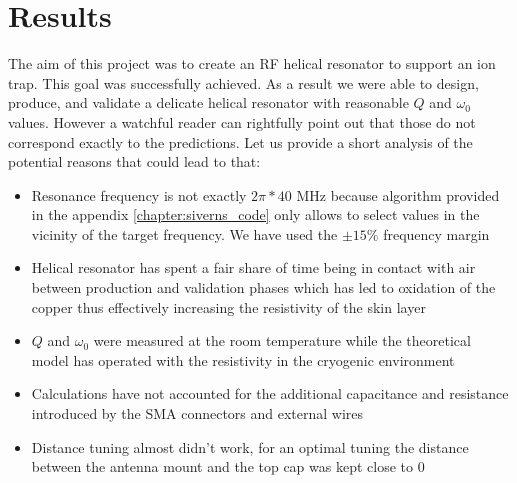 \chapter{Results}
\label{chapter:results}

The aim of this project was to create an RF helical resonator to support an ion trap. This goal was successfully achieved. As a result we were able to design, produce, and validate a delicate helical resonator with reasonable $Q$ and $\omega_0$ values. However a watchful reader can rightfully point out that those do not correspond exactly to the predictions. Let us provide a short analysis of the potential reasons that could lead to that:

\begin{itemize}
	\item Resonance frequency is not exactly $2\pi*40$ MHz because algorithm provided in the appendix \ref{chapter:siverns_code} only allows to select values in the vicinity of the target frequency. We have used the $\pm 15\%$ frequency margin
	\item Helical resonator has spent a fair share of time being in contact with air between production and validation phases which has led to oxidation of the copper thus effectively increasing the resistivity of the skin layer
	\item $Q$ and $\omega_0$ were measured at the room temperature while the theoretical model has operated with the resistivity in the cryogenic environment
	\item Calculations have not accounted for the additional capacitance and resistance introduced by the SMA connectors and external wires
	\item Distance tuning almost didn't work, for an optimal tuning the distance between the antenna mount and the top cap was kept close to 0
\end{itemize}